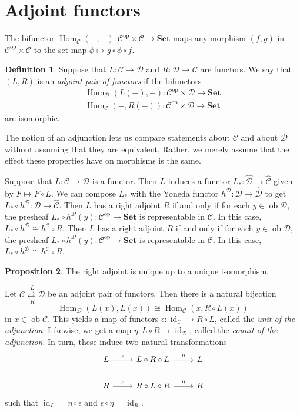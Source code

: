 \documentclass[10pt,letterpaper,cm]{nupset}
\theoremstyle{definition}
\newtheorem{definition}{Definition}[subsection]
\theoremstyle{theorem}
\newtheorem{prop}[definition]{Proposition}
\theoremstyle{remark}
\newcommand{\1}{\mathbf{1}}
\renewcommand{\c}{\mathscr{C}}
\renewcommand{\d}{\mathscr{D}}
\newcommand{\0}{\vec 0}
\DeclareMathOperator{\id}{\mathrm{id}}
\DeclareMathOperator{\op}{op}
\DeclareMathOperator{\ob}{ob}
\DeclareMathOperator{\Hom}{Hom}
\begin{document}
\section{Adjoint functors}

The bifunctor $\Hom_{\c}({-}, {-}) : \c^{\op} \times \c \to \mathbf{Set}$ maps any morphism $(f, g)$ in $\c^{\op} \times \c$ to the set map $\phi \mapsto g \circ \phi \circ f$.

\begin{definition}
Suppose that $L: \c \to \d$ and $R: \d \to \c$ are functors. We say that $(L, R)$ is an \textit{adjoint pair of functors} if the bifunctors
\begin{gather*}
\Hom_{\d}(L(-), -) : \c^{\op} \times \d \to \mathbf{Set}
\\  \Hom_{\c}(-, R(-)) : \c^{\op} \times \d \to \mathbf{Set} 
\end{gather*}
are isomorphic.
\end{definition}

 The notion of an adjunction lets us compare statements about  $\c$ and about $\d$ without assuming that they are equivalent. Rather,  we merely assume that the effect these properties have on morphisms is the same.

\medskip

Suppose that $L : \c \to \d$ is a functor. Then $L$ induces a functor $L_{\ast} : \widehat{\d} \to \widehat{\c}$ given by $F \mapsto F \circ L$. We can compose $L_{\ast}$ with the Yoneda functor $h^{\d} : \d \to \widehat{\d}$ to get $L_{\ast} \circ h^{\d} : \d \to \widehat{\c}$. Then $L$ has a right adjoint $R$  if and only if for each $y \in \ob \d$, the presheaf $L_{\ast} \circ h^{\d}(y) : \c^{\op} \to \mathbf{Set}$ is representable in $\c$. In this case, $L_{\ast} \circ h^{\d} \cong h^{\c} \circ R$. Then $L$ has a right adjoint $R$  if and only if for each $y \in \ob \d$, the presheaf $L_{\ast} \circ h^{\d}(y) : \c^{\op} \to \mathbf{Set}$ is representable in $\c$. In this case, $L_{\ast} \circ h^{\d} \cong h^{\c} \circ R$.

\begin{prop}
The right adjoint is unique up to a unique isomorphism.
\end{prop}

\medskip


 Let $\overset{L}{\underset{R}{\c \rightleftarrows \d}}$ be an adjoint pair of functors. Then there is a natural bijection $$\Hom_{\d}(L(x), L(x)) \cong \Hom_{\c}(x, R \circ L(x))$$ in $x\in \ob \c$. This yields a map of functors $\epsilon : \id_{\c} \to R \circ L$, called the \textit{unit of the adjunction}. Likewise, we get a map $\eta : L \circ R \to \id_{\d}$, called the \textit{counit of the adjunction}.
In turn, these induce two natural transformations 
\[
\begin{tikzcd}
L \arrow[r, "\epsilon"] & L \circ R \circ L \arrow[r, "\eta"] & L \\
R \arrow[r, "\epsilon"] & R\circ L \circ R \arrow[r, "\eta"] & R
\end{tikzcd}
\] such that $\id_L =\eta \circ \epsilon$ and $\epsilon \circ \eta = \id_R$. 
\end{document}
